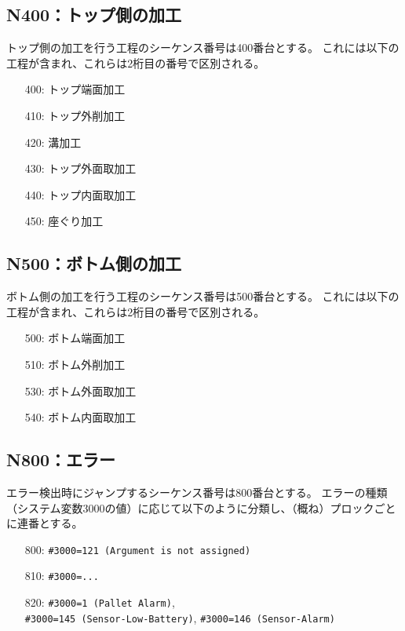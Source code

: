 \subsection{N400：トップ側の加工}
トップ側の加工を行う工程のシーケンス番号は400番台とする。
これには以下の工程が含まれ、これらは2桁目の番号で区別される。
\begin{enumerate}
\item[400:] トップ端面加工
\item[410:] トップ外削加工
\item[420:] 溝加工
\item[430:] トップ外面取加工
\item[440:] トップ内面取加工
\item[450:] 座ぐり加工
\end{enumerate}


\clearpage
\subsection{N500：ボトム側の加工}
ボトム側の加工を行う工程のシーケンス番号は500番台とする。
これには以下の工程が含まれ、これらは2桁目の番号で区別される。
\begin{enumerate}
\item[500:] ボトム端面加工
\item[510:] ボトム外削加工
\item[530:] ボトム外面取加工
\item[540:] ボトム内面取加工
\end{enumerate}


\subsection{N800：エラー\label{subsec:sequenceNerror}\TBW}
エラー検出時にジャンプするシーケンス番号は800番台とする。
エラーの種類（システム変数\ttNum3000の値）に応じて以下のように分類し、（概ね）プロックごとに連番とする。
\begin{enumerate}
\item[800:] \verb|#3000=121 (Argument is not assigned)|
\item[810:] \verb|#3000=...|
\item[820:] \verb|#3000=1 (Pallet Alarm)|,\\
            \verb|#3000=145 (Sensor-Low-Battery)|, \verb|#3000=146 (Sensor-Alarm)|
\end{enumerate}


